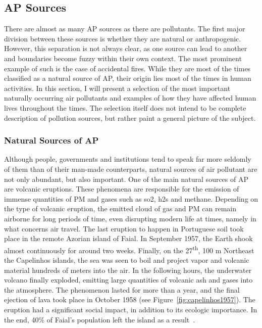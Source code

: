 \subsection{\acrlong{AP} Sources}%
\label{sub:ap_sources}

There are almost as many \gls{AP} sources as there are pollutants. The
first major division between these sources is whether they are natural
or anthropogenic. However, this separation is not always clear, as one
source can lead to another and boundaries become fuzzy within their own
context. The most prominent example of such is the case of accidental
fires. While they are most of the times classified as a natural source
of \gls{AP}, their origin lies most of the times in human activities. In
this section, I will present a selection of the most important naturally
occurring air pollutants and examples of how they have affected human
lives throughout the times. The selection itself does not intend to be
complete description of pollution sources, but rather paint a general
picture of the subject.

\subsubsection{Natural Sources of \acrlong{AP}}%
\label{ssub:natural_sources_of_ap}

Although people, governments and institutions tend to speak far more
seldomly of them than of their man-made counterparts, natural sources of
air pollutant are not only abundant, but also important. One of the main
natural sources of \gls{AP} are volcanic eruptions. These phenomena are
responsible for the emission of immense quantities of \gls{PM} and gases
such as \gls{so2}, \gls{h2s} and methane. Depending on the type of
volcanic eruption, the emitted cloud of gas and \gls{PM} can remain
airborne for long periods of time, even disrupting modern life at times,
namely in what concerns air travel. The last eruption to happen in
Portuguese soil took place in the remote Azorian island of Faial. In
September 1957, the Earth shook almost continuously for around two
weeks. Finally, on the 27\textsuperscript{th}, 100 m Northeast the
Capelinhos islands, the sea was seen to boil and project vapor and
volcanic material hundreds of meters into the air. In the following
hours, the underwater volcano finally exploded, emitting large
quantities of volcanic ash and gases into the atmosphere. The phenomenon
lasted for more than a year, and the final ejection of lava took place
in October 1958 (see Figure~\ref{fig:capelinhos1957}). The eruption had
a significant social impact, in addition to its ecologic importance. In
the end, 40\% of Faial's population left the island as a
result~\cite{Vallero2014, TSF2017}.

